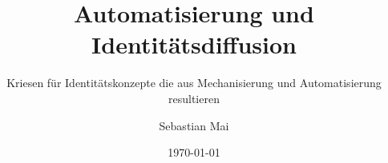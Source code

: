 \documentclass[a4paper,12pt,titlepage]{scrartcl}
\title{Automatisierung und Identitätsdiffusion}
\subtitle{Kriesen für Identitätskonzepte die aus Mechanisierung und Automatisierung resultieren}
\author{Sebastian Mai}
\date{\today} %
\begin{document}
\maketitle
\tableofcontents




\newpage
\sloppy
\printbibliography
\end{document}
